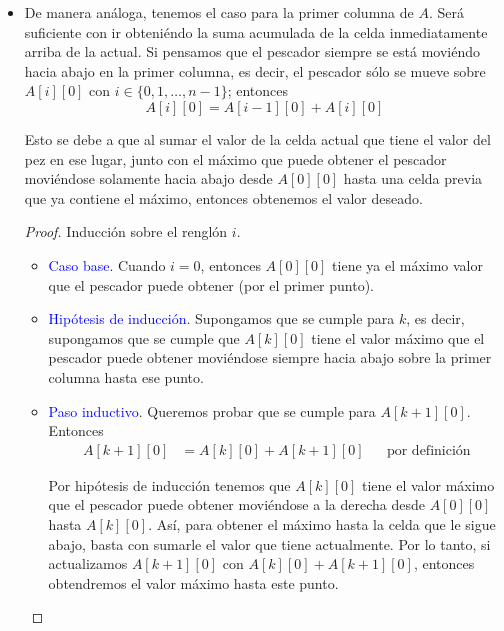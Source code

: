 \documentclass[letterpaper,11pt]{article}
\begin{document}
\begin{enumerate}
\begin{itemize}
\begin{proof}
        \end{proof}

        \item De manera análoga, tenemos el caso para la primer columna 
        de $A$. Será suficiente con ir obteniéndo la suma acumulada de la 
        celda inmediatamente arriba de la actual. Si pensamos que el 
        pescador siempre se está moviéndo hacia abajo en la primer columna, 
        es decir, el pescador sólo se mueve sobre $A[i][0]$ con 
        $i \in \{0, 1, \ldots, n-1\}$; entonces 
        \begin{equation*}
            A[i][0] = A[i-1][0] + A[i][0]
        \end{equation*}

        Esto se debe a que al sumar el valor de la celda actual que tiene 
        el valor del pez en ese lugar, junto con el máximo que puede obtener 
        el pescador moviéndose solamente hacia abajo desde $A[0][0]$ hasta 
        una celda previa que ya contiene el máximo, entonces obtenemos el 
        valor deseado. 
        \begin{proof}
            Inducción sobre el renglón $i$.
            \begin{itemize}
                \item \textcolor{blue}{Caso base}. Cuando $i = 0$, entonces 
                $A[0][0]$ tiene ya el máximo valor que el pescador puede 
                obtener (por el primer punto).

                \item \textcolor{blue}{Hipótesis de inducción}. Supongamos que 
                se cumple para $k$, es decir, supongamos que se cumple que 
                $A[k][0]$ tiene el valor máximo que el pescador puede obtener 
                moviéndose siempre hacia abajo sobre la primer columna hasta 
                ese punto.  

                \item \textcolor{blue}{Paso inductivo}. Queremos probar que se 
                cumple para $A[k+1][0]$. Entonces 
                \begin{align*}
                    A[k+1][0] &= A[k][0] + A[k+1][0]
                    && \text{por definición} 
                \end{align*}

                Por hipótesis de inducción tenemos que $A[k][0]$ tiene el valor 
                máximo que el pescador puede obtener moviéndose a la derecha 
                desde $A[0][0]$ hasta $A[k][0]$. Así, para obtener el máximo 
                hasta la celda que le sigue abajo, basta con sumarle el valor 
                que tiene actualmente. Por lo tanto, si actualizamos 
                $A[k+1][0]$ con $A[k][0] + A[k+1][0]$, entonces obtendremos el 
                valor máximo hasta este punto. 
            \end{itemize}


\end{proof}
\end{itemize}
\end{enumerate}
\end{document}

